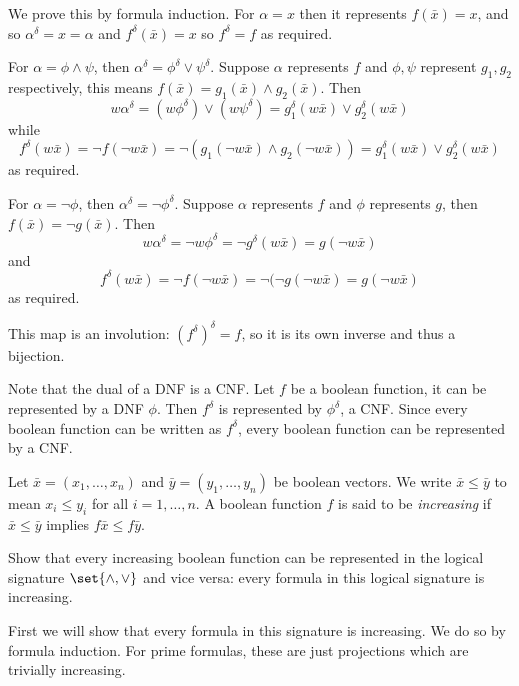 \eprob

\benum
    \item We prove this by formula induction.
    For $\alpha=x$ then it represents $f(\bar x)=x$, and so $\alpha^\delta=x=\alpha$ and $f^\delta(\bar x)=x$ so $f^\delta=f$ as required.

    For $\alpha=\phi\land\psi$, then $\alpha^\delta=\phi^\delta\lor\psi^\delta$.
    Suppose $\alpha$ represents $f$ and $\phi,\psi$ represent $g_1,g_2$ respectively, this means $f(\bar x)=g_1(\bar x)\land g_2(\bar x)$.
    Then
    $$ w\alpha^\delta = (w\phi^\delta)\lor(w\psi^\delta) = g_1^\delta(w\bar x)\lor g_2^\delta(w\bar x) $$
    while
    $$ f^\delta(w\bar x) = \neg f(\neg w\bar x) = \neg(g_1(\neg w\bar x)\land g_2(\neg w\bar x)) = g_1^\delta(w\bar x)\lor g_2^\delta(w\bar x) $$
    as required.

    For $\alpha=\neg\phi$, then $\alpha^\delta=\neg\phi^\delta$.
    Suppose $\alpha$ represents $f$ and $\phi$ represents $g$, then $f(\bar x)=\neg g(\bar x)$.
    Then
    $$ w\alpha^\delta = \neg w\phi^\delta = \neg g^\delta(w\bar x) = g(\neg w\bar x) $$
    and
    $$ f^\delta(w\bar x) = \neg f(\neg w\bar x) = \neg(\neg g(\neg w\bar x) = g(\neg w\bar x) $$
    as required.

    \item This map is an involution: $(f^\delta)^\delta=f$, so it is its own inverse and thus a bijection.

    \item Note that the dual of a DNF is a CNF.
    Let $f$ be a boolean function, it can be represented by a DNF $\phi$.
    Then $f^\delta$ is represented by $\phi^\delta$, a CNF.
    Since every boolean function can be written as $f^\delta$, every boolean function can be represented by a CNF.
\eenum

\bprob

    Let $\bar x=(x_1,\dots,x_n)$ and $\bar y=(y_1,\dots,y_n)$ be boolean vectors.
    We write $\bar x\leq\bar y$ to mean $x_i\leq y_i$ for all $i=1,\dots,n$.
    A boolean function $f$ is said to be {\it increasing} if $\bar x\leq\bar y$ implies
    $f\bar x\leq f\bar y$.

    Show that every increasing boolean function can be represented in the logical signature
    $\set{{\land},{\lor}}$ and vice versa: every formula in this logical signature is increasing.

\eprob

First we will show that every formula in this signature is increasing.
We do so by formula induction.
For prime formulas, these are just projections which are trivially increasing.

